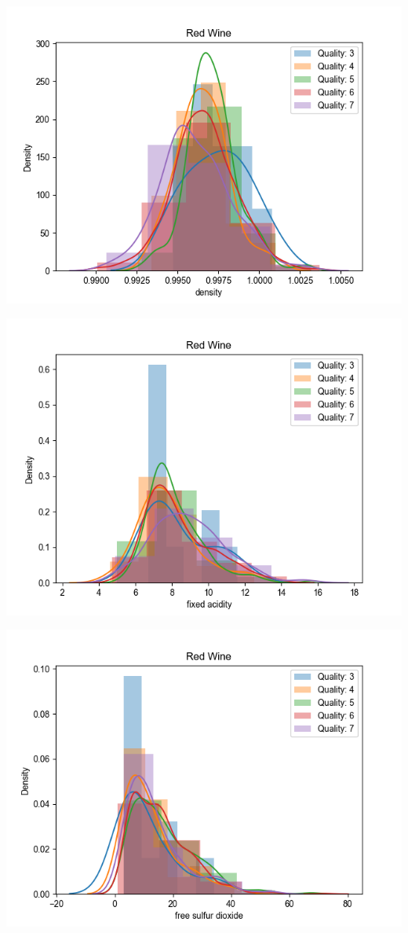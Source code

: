 \documentclass[12pt, letterpaper]{article}
\begin{document}
\includegraphics[scale=\myscale]{red_quality_dist_density.png}

\includegraphics[scale=\myscale]{red_quality_dist_fixed_acidity.png}

\includegraphics[scale=\myscale]{red_quality_dist_free_sulfur_dioxide.png}
\end{document}

